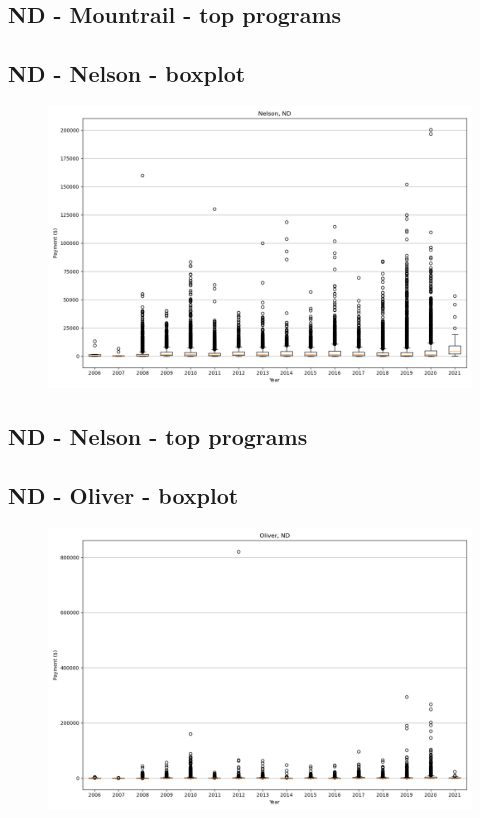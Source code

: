 \subsection*{ND - Mountrail - top programs}

\newpage
\subsection*{ND - Nelson - boxplot}
\begin{figure}[h]
\centering
\includegraphics[width=7in]{../output/boxplots/counties/Nelson-ND_boxplot.png}
\end{figure}


\subsection*{ND - Nelson - top programs}

\newpage
\subsection*{ND - Oliver - boxplot}
\begin{figure}[h]
\centering
\includegraphics[width=7in]{../output/boxplots/counties/Oliver-ND_boxplot.png}
\end{figure}


